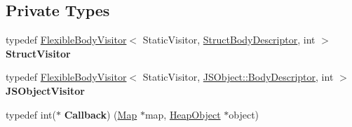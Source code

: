 \subsection*{Private Types}
\begin{DoxyCompactItemize}
\item 
typedef \hyperlink{classv8_1_1internal_1_1_flexible_body_visitor}{Flexible\+Body\+Visitor}$<$ Static\+Visitor, \hyperlink{classv8_1_1internal_1_1_flexible_body_descriptor}{Struct\+Body\+Descriptor}, int $>$ {\bfseries Struct\+Visitor}\hypertarget{classv8_1_1internal_1_1_static_new_space_visitor_ace2d61cfb14f9ece8af78783951e7ff2}{}\label{classv8_1_1internal_1_1_static_new_space_visitor_ace2d61cfb14f9ece8af78783951e7ff2}

\item 
typedef \hyperlink{classv8_1_1internal_1_1_flexible_body_visitor}{Flexible\+Body\+Visitor}$<$ Static\+Visitor, \hyperlink{classv8_1_1internal_1_1_flexible_body_descriptor}{J\+S\+Object\+::\+Body\+Descriptor}, int $>$ {\bfseries J\+S\+Object\+Visitor}\hypertarget{classv8_1_1internal_1_1_static_new_space_visitor_a6fab1f5ca3107d2478c9d48b5f2d55d2}{}\label{classv8_1_1internal_1_1_static_new_space_visitor_a6fab1f5ca3107d2478c9d48b5f2d55d2}

\item 
typedef int($\ast$ {\bfseries Callback}) (\hyperlink{classv8_1_1internal_1_1_map}{Map} $\ast$map, \hyperlink{classv8_1_1internal_1_1_heap_object}{Heap\+Object} $\ast$object)\hypertarget{classv8_1_1internal_1_1_static_new_space_visitor_a2f6026d8afef0d78ae014131d216385a}{}\label{classv8_1_1internal_1_1_static_new_space_visitor_a2f6026d8afef0d78ae014131d216385a}

\end{DoxyCompactItemize}
